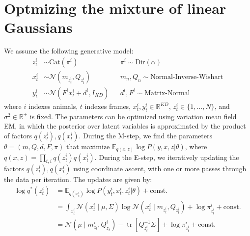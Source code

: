 \documentclass{article}         %
\DeclareMathOperator{\tr}{tr}
\begin{document}
\label{full-model-derivation}
\section{Optmizing the mixture of linear Gaussians}

We assume the following generative model:
\begin{align}
    z_t^i & \sim \text{Cat}(\pi^i) && 
    \pi^i \sim \text{Dir}(\alpha) \\
    x_t^i & \sim \mathcal{N}(m_{z_t^i}, Q_{z_t^i}) &&
    m_n, Q_n \sim \text{Normal-Inverse-Wishart} \\
    y_t^i & \sim \mathcal{N}(F^i x_t^i + d^i, I_{KD}) && 
    d^i, F^i \sim \text{Matrix-Normal}   
\end{align}
%
where $i$ indexes animals, $t$ indexes frames, $x_t^i, y_t^i \in \mathbb{R}^{KD}$, $z_t^i \in \{1,...,N\}$, and $\sigma^2 \in \mathbb{R}^+$ is fixed. The parameters can be optimized using variation mean field EM, in which the posterior over latent variables is approximated by the product of factors $q(z_t^i), q(x_t^i)$. During the M-step, we find the parameters $\theta = (m, Q, d, F, \pi)$  that maximize $\mathbb{E}_{q(x,z)} \log P(y,x,z | \theta)$, where $q(x,z) = \prod_{t,i} q(z_t^i) q(x_t^i)$. During the E-step, we iteratively updating the factors $q(z_t^i), q(x_t^i)$ using coordinate ascent, with one or more passes through the data per iteration. The updates are given by:
\begin{align}
\log q^*(z_t^i) & = \mathbb{E}_{q(x_t^i)} \log P(y_t^i, x_t^i, z_t^i | \theta) + \text{const.} \\
& = \int_{x_t^i} \mathcal{N}(x_t^i \mid \mu, \Sigma) \log \mathcal{N}(x_t^i \mid m_{z_t^i}, Q_{z_t^i}) + \log \pi^i_{z_t^i} + \text{const.} \\
& = \mathcal{N}(\mu \mid m_{z_t}^i, Q_{z_t}^i) - \tr [Q_{z_t^i}^{-1}\Sigma] + \log \pi^i_{z_t^i} + \text{const.}
\end{align}
\end{document}

